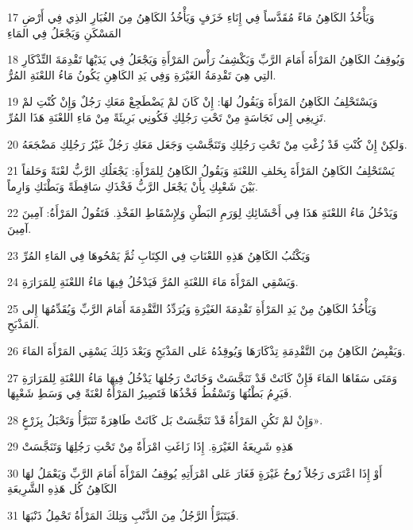 \par 17 وَيَأْخُذُ الكَاهِنُ مَاءً مُقَدَّساً فِي إِنَاءِ خَزَفٍ وَيَأْخُذُ الكَاهِنُ مِنَ الغُبَارِ الذِي فِي أَرْضِ المَسْكَنِ وَيَجْعَلُ فِي المَاءِ
\par 18 وَيُوقِفُ الكَاهِنُ المَرْأَةَ أَمَامَ الرَّبِّ وَيَكْشِفُ رَأْسَ المَرْأَةِ وَيَجْعَلُ فِي يَدَيْهَا تَقْدِمَةَ التِّذْكَارِ التِي هِيَ تَقْدِمَةُ الغَيْرَةِ وَفِي يَدِ الكَاهِنِ يَكُونُ مَاءُ اللعْنَةِ المُرُّ.
\par 19 وَيَسْتَحْلِفُ الكَاهِنُ المَرْأَةَ وَيَقُولُ لهَا: إِنْ كَانَ لمْ يَضْطَجِعْ مَعَكِ رَجُلٌ وَإِنْ كُنْتِ لمْ تَزِيغِي إِلى نَجَاسَةٍ مِنْ تَحْتِ رَجُلِكِ فَكُونِي بَرِيئَةً مِنْ مَاءِ اللعْنَةِ هَذَا المُرِّ.
\par 20 وَلكِنْ إِنْ كُنْتِ قَدْ زُغْتِ مِنْ تَحْتِ رَجُلِكِ وَتَنَجَّسْتِ وَجَعَل مَعَكِ رَجُلٌ غَيْرُ رَجُلِكِ مَضْجَعَهُ.
\par 21 يَسْتَحْلِفُ الكَاهِنُ المَرْأَةَ بِحَلفِ اللعْنَةِ وَيَقُولُ الكَاهِنُ لِلمَرْأَةِ: يَجْعَلُكِ الرَّبُّ لعْنَةً وَحَلفاً بَيْنَ شَعْبِكِ بِأَنْ يَجْعَل الرَّبُّ فَخْذَكِ سَاقِطَةً وَبَطْنَكِ وَارِماً.
\par 22 وَيَدْخُلُ مَاءُ اللعْنَةِ هَذَا فِي أَحْشَائِكِ لِوَرَمِ البَطْنِ وَلِإِسْقَاطِ الفَخْذِ. فَتَقُولُ المَرْأَةُ: آمِينَ آمِينَ.
\par 23 وَيَكْتُبُ الكَاهِنُ هَذِهِ اللعْنَاتِ فِي الكِتَابِ ثُمَّ يَمْحُوهَا فِي المَاءِ المُرِّ
\par 24 وَيَسْقِي المَرْأَةَ مَاءَ اللعْنَةِ المُرَّ فَيَدْخُلُ فِيهَا مَاءُ اللعْنَةِ لِلمَرَارَةِ.
\par 25 وَيَأْخُذُ الكَاهِنُ مِنْ يَدِ المَرْأَةِ تَقْدِمَةَ الغَيْرَةِ وَيُرَدِّدُ التَّقْدِمَةَ أَمَامَ الرَّبِّ وَيُقَدِّمُهَا إِلى المَذْبَحِ.
\par 26 وَيَقْبِضُ الكَاهِنُ مِنَ التَّقْدِمَةِ تِذْكَارَهَا وَيُوقِدُهُ عَلى المَذْبَحِ وَبَعْدَ ذَلِكَ يَسْقِي المَرْأَةَ المَاءَ.
\par 27 وَمَتَى سَقَاهَا المَاءَ فَإِنْ كَانَتْ قَدْ تَنَجَّسَتْ وَخَانَتْ رَجُلهَا يَدْخُلُ فِيهَا مَاءُ اللعْنَةِ لِلمَرَارَةِ فَيَرِمُ بَطْنُهَا وَتَسْقُطُ فَخْذُهَا فَتَصِيرُ المَرْأَةُ لعْنَةً فِي وَسَطِ شَعْبِهَا.
\par 28 وَإِنْ لمْ تَكُنِ المَرْأَةُ قَدْ تَنَجَّسَتْ بَل كَانَتْ طَاهِرَةً تَتَبَرَّأُ وَتَحْبَلُ بِزَرْعٍ».
\par 29 هَذِهِ شَرِيعَةُ الغَيْرَةِ. إِذَا زَاغَتِ امْرَأَةٌ مِنْ تَحْتِ رَجُلِهَا وَتَنَجَّسَتْ
\par 30 أَوْ إِذَا اعْتَرَى رَجُلاً رُوحُ غَيْرَةٍ فَغَارَ عَلى امْرَأَتِهِ يُوقِفُ المَرْأَةَ أَمَامَ الرَّبِّ وَيَعْمَلُ لهَا الكَاهِنُ كُل هَذِهِ الشَّرِيعَةِ
\par 31 فَيَتَبَرَّأُ الرَّجُلُ مِنَ الذَّنْبِ وَتِلكَ المَرْأَةُ تَحْمِلُ ذَنْبَهَا.

